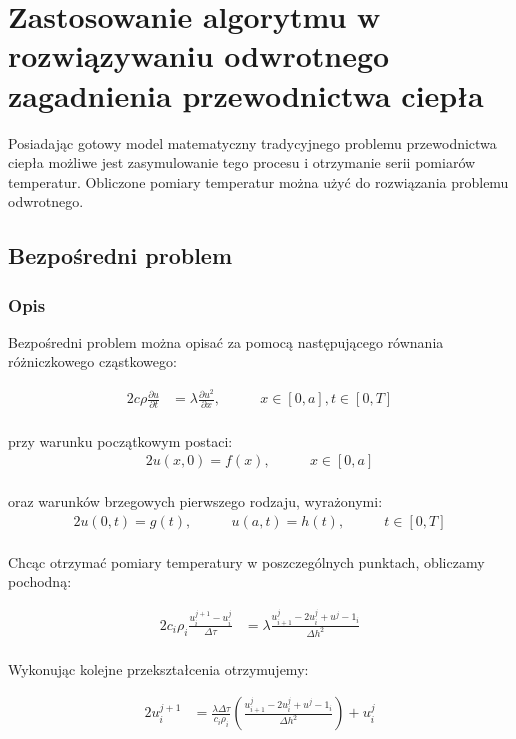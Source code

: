 \documentclass[twoside]{projektInzynierskiMS1}
\newcommand{\si}{ś}
\begin{document}
\section{Zastosowanie algorytmu w rozwiązywaniu odwrotnego zagadnienia przewodnictwa ciepła}
Posiadając gotowy model matematyczny tradycyjnego problemu przewodnictwa ciepła możliwe jest zasymulowanie tego procesu i otrzymanie serii pomiarów temperatur. Obliczone pomiary temperatur można użyć do rozwiązania problemu odwrotnego. 
\subsection{Bezpo\si redni problem}
\subsubsection{Opis}

Bezpo\si redni problem można opisać za pomocą następującego równania różniczkowego cząstkowego:

\begin{alignat*}{2}
c\rho \frac{\partial u}{\partial t}&= \lambda \frac{\partial u^2}{\partial x},&\qquad  x \in [0, a], t \in [0, T]\\
\end{alignat*}

przy warunku początkowym postaci:
\begin{alignat*}{2}
u(x, 0) = f(x),&\qquad  x \in [0, a]\\
\end{alignat*}

oraz warunków brzegowych pierwszego rodzaju, wyrażonymi:
\begin{alignat*}{2}
u(0,t) = g(t),&\qquad  u(a, t) = h(t), &\qquad t \in [0, T]\\
\end{alignat*}

Chcąc otrzymać pomiary temperatury w poszczególnych punktach, obliczamy pochodną:

\begin{alignat*}{2}
c_i \rho _i \frac{ u^{j+1}_i - u^j_i}{ \Delta \tau}&= \lambda \frac{ u^j_{i+1} - 2u^j_i+u^j-1_i}{\Delta h^2}\\
\end{alignat*}

Wykonując kolejne przekształcenia otrzymujemy:

\begin{alignat*}{2}
 u^{j+1}_i&= \frac{\lambda \Delta \tau}{c_i \rho _i} \left( \frac{u^j_{i+1} - 2u^j_i+u^j-1_i}{\Delta h^2} \right) + u^j_i\\
\end{alignat*}
\end{document}
